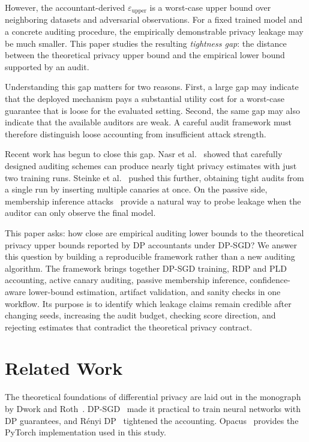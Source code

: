 \documentclass{article}
\begin{document}
However, the accountant-derived $\varepsilon_{\text{upper}}$ is a worst-case upper bound over neighboring datasets and adversarial observations. For a fixed trained model and a concrete auditing procedure, the empirically demonstrable privacy leakage may be much smaller. This paper studies the resulting \emph{tightness gap}: the distance between the theoretical privacy upper bound and the empirical lower bound supported by an audit.

Understanding this gap matters for two reasons. First, a large gap may indicate that the deployed mechanism pays a substantial utility cost for a worst-case guarantee that is loose for the evaluated setting. Second, the same gap may also indicate that the available auditors are weak. A careful audit framework must therefore distinguish loose accounting from insufficient attack strength.

Recent work has begun to close this gap. Nasr et al.~\citep{nasr2023tight} showed that carefully designed auditing schemes can produce nearly tight privacy estimates with just two training runs. Steinke et al.~\citep{steinke2023privacy} pushed this further, obtaining tight audits from a single run by inserting multiple canaries at once. On the passive side, membership inference attacks~\citep{shokri2017membership, carlini2022membership} provide a natural way to probe leakage when the auditor can only observe the final model.

This paper asks: how close are empirical auditing lower bounds to the theoretical privacy upper bounds reported by DP accountants under DP-SGD? We answer this question by building a reproducible framework rather than a new auditing algorithm. The framework brings together DP-SGD training, RDP and PLD accounting, active canary auditing, passive membership inference, confidence-aware lower-bound estimation, artifact validation, and sanity checks in one workflow. Its purpose is to identify which leakage claims remain credible after changing seeds, increasing the audit budget, checking score direction, and rejecting estimates that contradict the theoretical privacy contract.

\section{Related Work}

The theoretical foundations of differential privacy are laid out in the monograph by Dwork and Roth~\citep{dwork2014algorithmic}. DP-SGD~\citep{abadi2016deep} made it practical to train neural networks with DP guarantees, and R\'{e}nyi DP~\citep{mironov2017renyi} tightened the accounting. Opacus~\citep{yousefpour2021opacus} provides the PyTorch implementation used in this study.
\end{document}
